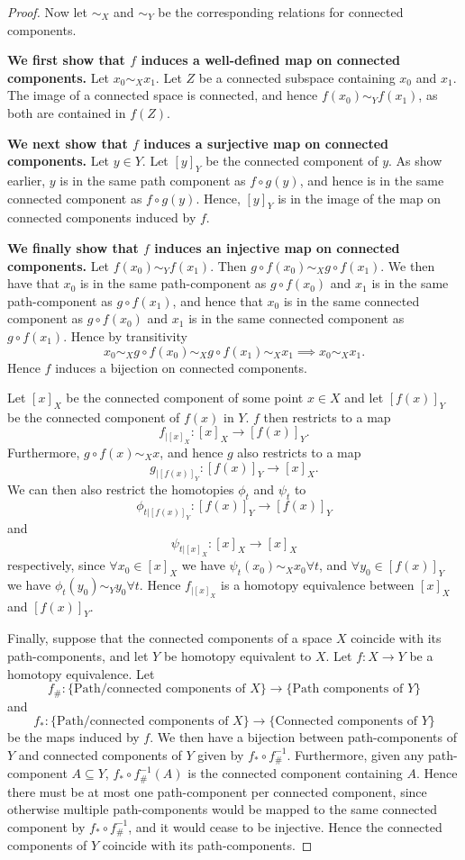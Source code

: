 \documentclass{article}
\begin{document}
\begin{proof}
\noindent Now let $\sim_X$ and $\sim_Y$ be the corresponding relations for connected components.

\textbf{We first show that $f$ induces a well-defined map on connected components.}
Let $x_0\sim_X x_1$. Let $Z$ be a connected subspace containing $x_0$ and $x_1$. The image of a connected space is connected, and hence $f(x_0)\sim_Y f(x_1)$, as both are contained in $f(Z)$.

\textbf{We next show that $f$ induces a surjective map on connected components.}
Let $y\in Y$. Let $[y]_Y$ be the connected component of $y$. As show earlier, $y$ is in the same path component as $f\circ g(y)$, and hence is in the same connected component as $f\circ g(y)$. Hence, $[y]_Y$ is in the image of the map on connected components induced by $f$.

\textbf{We finally show that $f$ induces an injective map on connected components.}
Let $f(x_0)\sim_Yf(x_1)$. Then $g\circ f(x_0)\sim_X g\circ f(x_1)$. We then have that $x_0$ is in the same path-component as $g\circ f(x_0)$ and $x_1$ is in the same path-component as $g\circ f(x_1)$, and hence that $x_0$ is in the same connected component as $g\circ f(x_0)$ and $x_1$ is in the same connected component as $g\circ f(x_1)$. Hence by transitivity\[x_0\sim_X g\circ f(x_0)\sim_Xg\circ f(x_1)\sim_X x_1\implies x_0\sim_X x_1.\] Hence $f$ induces a bijection on connected components.

Let $[x]_X$ be the connected component of some point $x\in X$ and let $[f(x)]_Y$ be the connected component of $f(x)$ in $Y$. $f$ then restricts to a map\[f_{|[x]_X}:[x]_X\to [f(x)]_Y.\]Furthermore, $g\circ f(x)\sim_X x$, and hence $g$ also restricts to a map \[g_{|[f(x)]_Y}:[f(x)]_Y\to[x]_X.\]We can then also restrict the homotopies $\phi_t$ and $\psi_t$ to \[\phi_{t|[f(x)]_Y}:[f(x)]_Y\to[f(x)]_Y\] and \[\psi_{t|[x]_X}:[x]_X\to[x]_X\] respectively, since $\forall x_0\in[x]_X$ we have $\psi_t(x_0)\sim_Xx_0\forall t$, and $\forall y_0\in[f(x)]_Y$ we have $\phi_t(y_0)\sim_Y y_0\forall t$. Hence $f_{|[x]_X}$ is a homotopy equivalence between $[x]_X$ and $[f(x)]_Y$.

Finally, suppose that the connected components of a space $X$ coincide with its path-components, and let $Y$ be homotopy equivalent to $X$. Let $f:X\to Y$ be a homotopy equivalence. Let \[f_\#:\{\text{Path/connected components of } X\}\to\{\text{Path components of } Y\}\] and \[f_*:\{\text{Path/connected components of } X\}\to\{\text{Connected components of } Y\}\] be the maps induced by $f$. We then have a bijection between path-components of $Y$ and connected components of $Y$ given by $f_*\circ f_\#^{-1}$. Furthermore, given any path-component $A\subseteq Y$, $f_*\circ f_\#^{-1}(A)$ is the connected component containing $A$. Hence there must be at most one path-component per connected component, since otherwise multiple path-components would be mapped to the same connected component by $f_*\circ f_\#^{-1}$, and it would cease to be injective. Hence the connected components of $Y$ coincide with its path-components.
\end{proof}
\end{document}
